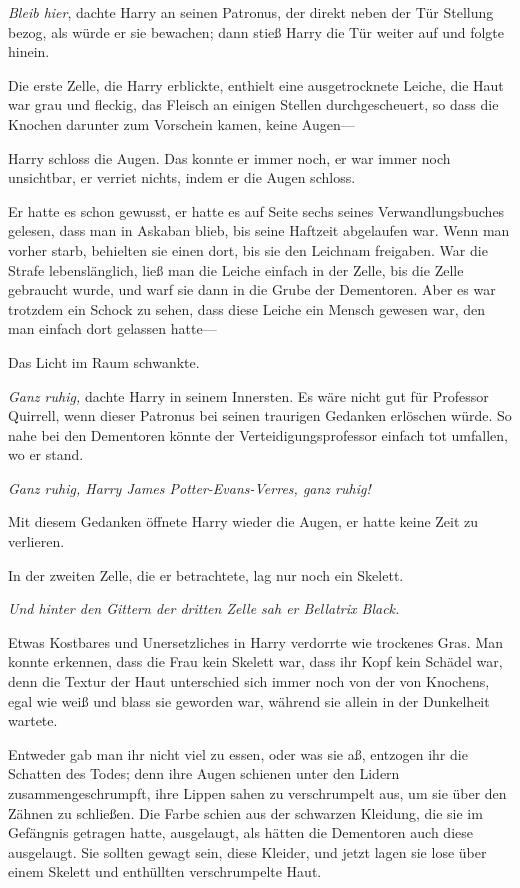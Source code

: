 {\emph{Bleib hier}, dachte Harry an seinen Patronus, der direkt neben der Tür Stellung bezog, als würde er sie bewachen; dann stieß Harry die Tür weiter auf und folgte hinein.

Die erste Zelle, die Harry erblickte, enthielt eine ausgetrocknete Leiche, die Haut war grau und fleckig, das Fleisch an einigen Stellen durchgescheuert, so dass die Knochen darunter zum Vorschein kamen, keine Augen—

Harry schloss die Augen. Das konnte er immer noch, er war immer noch unsichtbar, er verriet nichts, indem er die Augen schloss.

Er hatte es schon gewusst, er hatte es auf Seite sechs seines Verwandlungsbuches gelesen, dass man in Askaban blieb, bis seine Haftzeit abgelaufen war. Wenn man vorher starb, behielten sie einen dort, bis sie den Leichnam freigaben. War die Strafe lebenslänglich, ließ man die Leiche einfach in der Zelle, bis die Zelle gebraucht wurde, und warf sie dann in die Grube der Dementoren. Aber es war trotzdem ein Schock zu sehen, dass diese Leiche ein Mensch gewesen war, den man einfach dort gelassen hatte—

Das Licht im Raum schwankte.

\emph{Ganz ruhig,} dachte Harry in seinem Innersten. Es wäre nicht gut für Professor Quirrell, wenn dieser Patronus bei seinen traurigen Gedanken erlöschen würde. So nahe bei den Dementoren könnte der Verteidigungsprofessor einfach tot umfallen, wo er stand.

\emph{Ganz ruhig, Harry James Potter-Evans-Verres, ganz ruhig!}

Mit diesem Gedanken öffnete Harry wieder die Augen, er hatte keine Zeit zu verlieren.

In der zweiten Zelle, die er betrachtete, lag nur noch ein Skelett.

\emph{Und hinter den Gittern der dritten Zelle sah er Bellatrix Black.}

Etwas Kostbares und Unersetzliches in Harry verdorrte wie trockenes Gras. Man konnte erkennen, dass die Frau kein Skelett war, dass ihr Kopf kein Schädel war, denn die Textur der Haut unterschied sich immer noch von der von Knochens, egal wie weiß und blass sie geworden war, während sie allein in der Dunkelheit wartete.

Entweder gab man ihr nicht viel zu essen, oder was sie aß, entzogen ihr die Schatten des Todes; denn ihre Augen schienen unter den Lidern zusammengeschrumpft, ihre Lippen sahen zu verschrumpelt aus, um sie über den Zähnen zu schließen. Die Farbe schien aus der schwarzen Kleidung, die sie im Gefängnis getragen hatte, ausgelaugt, als hätten die Dementoren auch diese ausgelaugt. Sie sollten gewagt sein, diese Kleider, und jetzt lagen sie lose über einem Skelett und enthüllten verschrumpelte Haut.

}
